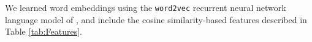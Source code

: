 {} We learned word embeddings using the \texttt{word2vec} recurrent neural network language model of \citet{mikolov13}, and include the cosine similarity-based features described in Table \ref{tab:Features}. %

